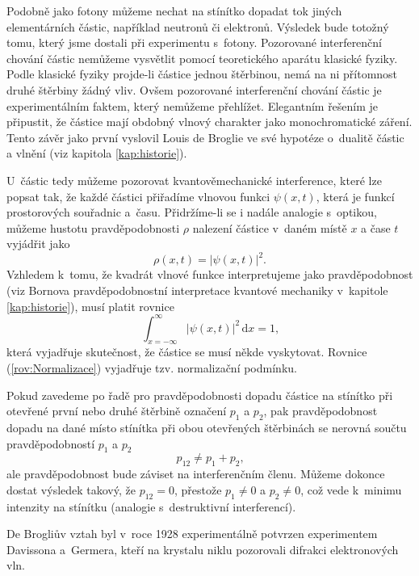 Podobně jako fotony můžeme nechat na stínítko dopadat tok jiných elementárních částic, například neutronů či elektronů. Výsledek bude totožný tomu, který jsme dostali při experimentu s~fotony. Pozorované interferenční chování částic nemůžeme vysvětlit pomocí teoretického aparátu klasické fyziky. Podle klasické fyziky projde-li částice jednou štěrbinou, nemá na ni přítomnost druhé štěrbiny žádný vliv. Ovšem pozorované interferenční chování částic je experimentálním faktem, který nemůžeme přehlížet. Elegantním řešením je připustit, že částice mají obdobný vlnový charakter jako monochromatické záření. Tento závěr jako první vyslovil Louis de Broglie ve své hypotéze o~dualitě částic a vlnění (viz kapitola \ref{kap:historie}).

U~částic tedy můžeme pozorovat kvantověmechanické interference, které lze popsat tak, že každé částici přiřadíme vlnovou funkci $\psi(x, t)$, která je funkcí prostorových souřadnic a~času. Přidržíme-li se i nadále analogie s~optikou, můžeme hustotu pravděpodobnosti $\rho$ nalezení částice v~daném místě $x$ a čase $t$ vyjádřit jako
\begin{equation}
\rho(x, t) = |\psi(x,t)|^2 \mbox{.}
\label{rov:VlnovaFce-castice}
\end{equation}
Vzhledem k~tomu, že kvadrát vlnové funkce interpretujeme jako pravděpodobnost (viz Bornova pravděpodobnostní interpretace kvantové mechaniky v~kapitole \ref{kap:historie}), musí platit rovnice
\begin{equation}
\int_{x=-\infty}^\infty |\psi(x,t)|^2 \,\mathrm{d}x = 1 \mbox{,}
\label{rov:Normalizace}
\end{equation}
která vyjadřuje skutečnost, že částice se musí někde vyskytovat. Rovnice (\ref{rov:Normalizace}) vyjadřuje tzv. normalizační podmínku.

Pokud zavedeme po řadě pro pravděpodobnosti dopadu částice na stínítko při otevřené první nebo druhé štěrbině označení $p_1$ a $p_2$, pak pravděpodobnost dopadu na dané místo stínítka při obou otevřených štěrbinách se nerovná součtu pravděpodobností $p_1$ a $p_2$
\begin{equation}
p_{12} \not = p_1 + p_2 \mbox{,}
\label{rov:Pravdepodobnosti-Stinitko}
\end{equation}
ale pravděpodobnost bude záviset na interferenčním členu. Můžeme dokonce dostat výsledek takový, že $p_{12} = 0$, přestože $p_1 \not =  0$ a $p_2 \not = 0$, což vede k~minimu intenzity na stínítku (analogie s~destruktivní interferencí).

De Brogliův vztah byl v~roce 1928 experimentálně potvrzen experimentem Davissona a~Germera, kteří na krystalu niklu pozorovali difrakci elektronových vln.

